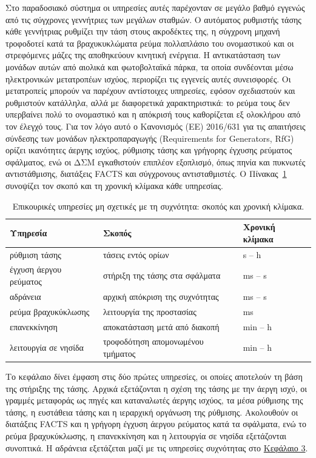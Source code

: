 Στο παραδοσιακό σύστημα οι υπηρεσίες αυτές παρέχονταν σε μεγάλο βαθμό εγγενώς από τις
σύγχρονες γεννήτριες των μεγάλων σταθμών. Ο αυτόματος ρυθμιστής τάσης κάθε γεννήτριας
ρυθμίζει την τάση στους ακροδέκτες της, η σύγχρονη μηχανή τροφοδοτεί κατά τα βραχυκυκλώματα
ρεύμα πολλαπλάσιο του ονομαστικού και οι στρεφόμενες μάζες της αποθηκεύουν κινητική ενέργεια.
Η αντικατάσταση των μονάδων αυτών από αιολικά και φωτοβολταϊκά πάρκα, τα οποία συνδέονται
μέσω ηλεκτρονικών μετατροπέων ισχύος, περιορίζει τις εγγενείς αυτές συνεισφορές. Οι
μετατροπείς μπορούν να παρέχουν αντίστοιχες υπηρεσίες, εφόσον σχεδιαστούν και ρυθμιστούν
κατάλληλα, αλλά με διαφορετικά χαρακτηριστικά: το ρεύμα τους δεν υπερβαίνει πολύ το ονομαστικό
και η απόκρισή τους καθορίζεται εξ ολοκλήρου από τον έλεγχό τους. Για τον λόγο αυτό ο
Κανονισμός (ΕΕ) 2016/631 για τις απαιτήσεις σύνδεσης των μονάδων ηλεκτροπαραγωγής
(Requirements for Generators, RfG) ορίζει ικανότητες άεργης ισχύος, ρύθμισης τάσης και
γρήγορης έγχυσης ρεύματος σφάλματος, ενώ οι ΔΣΜ εγκαθιστούν επιπλέον εξοπλισμό, όπως πηνία
και πυκνωτές αντιστάθμισης, διατάξεις FACTS και σύγχρονους αντισταθμιστές. Ο
Πίνακας~\ref{tab:nfas} συνοψίζει τον σκοπό και τη χρονική κλίμακα κάθε υπηρεσίας.

\begin{table}[!htbp]
\centering
\begin{tabular}{lll}
\hline
Υπηρεσία & Σκοπός & Χρονική κλίμακα \\
\hline
ρύθμιση τάσης & τάσεις εντός ορίων & s -- h \\
έγχυση άεργου ρεύματος & στήριξη της τάσης στα σφάλματα & ms -- s \\
αδράνεια & αρχική απόκριση της συχνότητας & ms -- s \\
ρεύμα βραχυκύκλωσης & λειτουργία της προστασίας & ms \\
επανεκκίνηση & αποκατάσταση μετά από διακοπή & min -- h \\
λειτουργία σε νησίδα & τροφοδότηση απομονωμένου τμήματος & min -- h \\
\hline
\end{tabular}
\caption{Επικουρικές υπηρεσίες μη σχετικές με τη συχνότητα: σκοπός και χρονική κλίμακα.}
\label{tab:nfas}
\end{table}

Το κεφάλαιο δίνει έμφαση στις δύο πρώτες υπηρεσίες, οι οποίες αποτελούν τη βάση της στήριξης
της τάσης. Αρχικά εξετάζονται η σχέση της τάσης με την άεργη ισχύ, οι γραμμές μεταφοράς ως
πηγές και καταναλωτές άεργης ισχύος, τα μέσα ρύθμισης της τάσης, η ευστάθεια τάσης και η
ιεραρχική οργάνωση της ρύθμισης. Ακολουθούν οι διατάξεις FACTS και η γρήγορη έγχυση άεργου
ρεύματος κατά τα σφάλματα, ενώ το ρεύμα βραχυκύκλωσης, η επανεκκίνηση και η λειτουργία σε
νησίδα εξετάζονται συνοπτικά. Η αδράνεια εξετάζεται μαζί με τις υπηρεσίες συχνότητας στο
\hyperref[kef-03-theoria]{Κεφάλαιο 3}.

